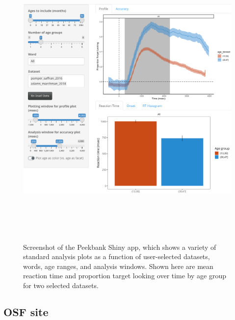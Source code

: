 \documentclass[
  english,
  man,floatsintext]{apa6}
\providecommand{\DIFaddbeginFL}{} %
\providecommand{\DIFaddendFL}{} %
\providecommand{\DIFdelbeginFL}{} %
\providecommand{\DIFdelendFL}{} %
\newcommand{\DIFscaledelfig}{0.5}
\newlength{\DIFdelgraphicswidth} %
\newlength{\DIFdelgraphicsheight} %
\newcommand{\DIFaddincludegraphics}[2][]{{\color{blue}\fbox{\DIFOincludegraphics[#1]{#2}}}} %
\newcommand{\DIFdelincludegraphics}[2][]{%
\sbox{\DIFdelgraphicsbox}{\DIFOincludegraphics[#1]{#2}}%
\settoboxwidth{\DIFdelgraphicswidth}{\DIFdelgraphicsbox} %
\settoboxtotalheight{\DIFdelgraphicsheight}{\DIFdelgraphicsbox} %
\scalebox{\DIFscaledelfig}{%
\parbox[b]{\DIFdelgraphicswidth}{\usebox{\DIFdelgraphicsbox}\\[-\baselineskip] \rule{\DIFdelgraphicswidth}{0em}}\llap{\resizebox{\DIFdelgraphicswidth}{\DIFdelgraphicsheight}{%
\setlength{\unitlength}{\DIFdelgraphicswidth}%
\begin{picture}(1,1)%
\thicklines\linethickness{2pt} %
{\color[rgb]{1,0,0}\put(0,0){\framebox(1,1){}}}%
{\color[rgb]{1,0,0}\put(0,0){\line( 1,1){1}}}%
{\color[rgb]{1,0,0}\put(0,1){\line(1,-1){1}}}%
\end{picture}%
}\hspace*{3pt}}} %
} %
\DeclareRobustCommand{\DIFaddbeginFL}{\DIFOaddbeginFL \let\includegraphics\DIFaddincludegraphics} %
\DeclareRobustCommand{\DIFaddendFL}{\DIFOaddendFL \let\includegraphics\DIFOincludegraphics} %
\DeclareRobustCommand{\DIFdelbeginFL}{\DIFOdelbeginFL \let\includegraphics\DIFdelincludegraphics} %
\DeclareRobustCommand{\DIFdelendFL}{\DIFOaddendFL \let\includegraphics\DIFOincludegraphics} %
\begin{document}
\begin{figure}

{\centering \DIFdelbeginFL %
\DIFdelendFL \DIFaddbeginFL \includegraphics[width=6.94in,height=6in]{brm/figures/shiny-full-window} 
\DIFaddendFL 

}

\caption{Screenshot of the Peekbank Shiny app, which shows a variety of standard analysis plots as a function of user-selected datasets, words, age ranges, and analysis windows. Shown here are mean reaction time and proportion target looking over time by age group for two selected datasets.}\label{fig:shiny}
\end{figure}

\hypertarget{osf-site}{%
\subsection{OSF site}\label{osf-site}}
\end{document}
